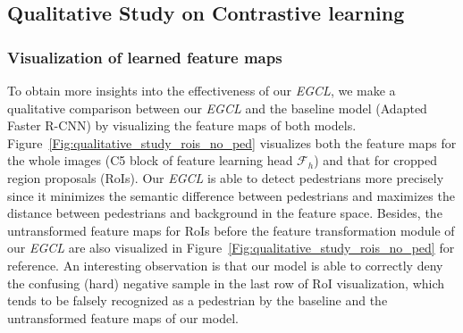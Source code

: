 \documentclass[journal]{IEEEtran}
\newcommand{\MR}[1]{\textcolor[rgb]{0,0,0} {#1}}
\begin{document}
\begin{comment}
\begin{table}[!t]
\centering
\caption{Performance ( in terms of $MR^{-2}$) of our \emph{EGCL} and other methods on NightOwls validation subset (lower is better).}
\renewcommand\arraystretch{0.8} 
\resizebox{0.6\linewidth}{!}{
\begin{tabular}{l| c c }
\toprule[0.13mm]
\multicolumn{1}{l|}{Methods}&\multicolumn{1}{c}{Backbone} &\multicolumn{1}{c}{\textbf{\tiny Reasonable}} \\
\midrule[0.08mm]
\tiny ACF~\cite{dollar2014fast} & \tiny -- & \tiny 51.68\\
\tiny Checkerboards~\cite{zhang2015filtered}  & \tiny -- & \tiny 39.67 \\
\tiny Vanilla Faster R-CNN~\cite{ren2016faster} & \tiny VGG-16 & \tiny 20.00 \\
\tiny Adapted Faster R-CNN~\cite{zhang2017citypersons} &\tiny VGG-16&\tiny 18.81 \\
\tiny RPN+BF~\cite{zhang2016faster}   & \tiny VGG-16          &         \tiny 23.26    \\
 SDS-RCNN~\cite{brazil2017illuminating}    & \tiny VGG-16          &    \tiny 17.80  \\        
 \MR{TFAN~\cite{wu2020temporal}}    & \MR{ResNet-50}         &     \MR{16.50} \\
\tiny \emph{EGCL} (ours)   & \tiny VGG-16         & \textbf{\tiny 15.93}\\                               
\bottomrule[0.13mm]
\end{tabular}
}
\label{tab:comparison_nightowls}
\end{table}
\end{comment}

\subsection{Qualitative Study on Contrastive learning}
\subsubsection{Visualization of learned feature maps} To obtain more insights into the effectiveness of our \emph{EGCL}, we make a qualitative comparison between our \emph{EGCL} and the baseline model (Adapted Faster R-CNN)  by visualizing the feature maps of both models. Figure~\ref{Fig:qualitative_study_rois_no_ped} visualizes both the feature maps for the whole images (C5 block of feature learning head $\mathcal{F}_h$) and that for cropped region proposals (RoIs). Our \emph{EGCL} is able to detect pedestrians more precisely since it minimizes the semantic difference between pedestrians and maximizes the distance between pedestrians and background in the feature space. Besides, the untransformed feature maps for RoIs before the feature transformation module of our \emph{EGCL} are also visualized in Figure~\ref{Fig:qualitative_study_rois_no_ped} for reference. An interesting observation is that  our model is able to correctly deny the confusing (hard) negative sample in the last row of RoI visualization, which tends to be falsely recognized as a pedestrian by the baseline and the untransformed feature maps of our model.
\end{document}
